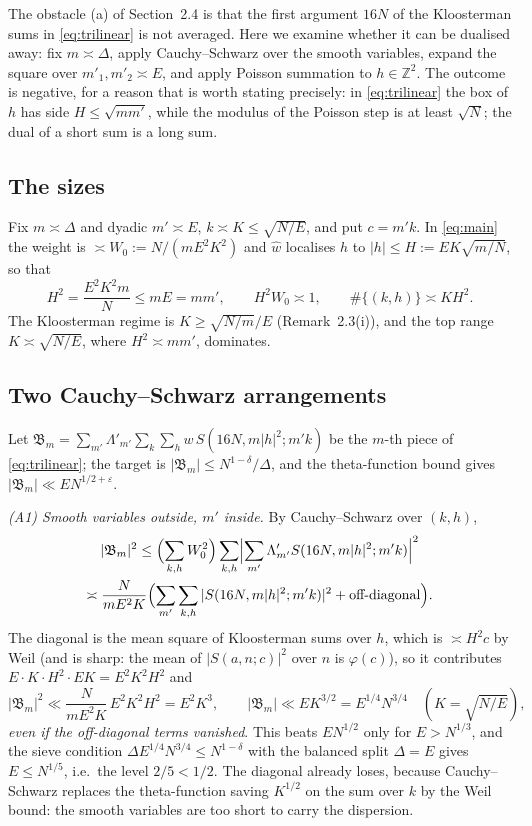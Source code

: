 \documentclass[11pt,a4paper]{article}
\theoremstyle{remark}
\theoremstyle{definition}
\newcommand{\Z}{\mathbb Z}
\newcommand{\e}{\varepsilon}
\begin{document}
The obstacle (a) of Section~2.4 is that the first argument $16N$ of the Kloosterman sums in \eqref{eq:trilinear} is not averaged. Here we examine whether it can be dualised away: fix $m\asymp\Delta$, apply Cauchy--Schwarz over the smooth variables, expand the square over $m'_1,m'_2\asymp E$, and apply Poisson summation to $h\in\Z^2$. The outcome is negative, for a reason that is worth stating precisely: in \eqref{eq:trilinear} the box of $h$ has side $H\le\sqrt{mm'}$, while the modulus of the Poisson step is at least $\sqrt N$; the dual of a short sum is a long sum.

\subsection{The sizes}
Fix $m\asymp\Delta$ and dyadic $m'\asymp E$, $k\asymp K\le\sqrt{N/E}$, and put $c=m'k$. In \eqref{eq:main} the weight is $\asymp W_0:=N/(mE^2K^2)$ and $\hat w$ localises $h$ to $|h|\le H:=EK\sqrt{m/N}$, so that
\begin{equation}\label{eq:sizes}
H^2=\frac{E^2K^2m}{N}\le mE=mm',\qquad H^2W_0\asymp1,\qquad \#\{(k,h)\}\asymp KH^2 .
\end{equation}
The Kloosterman regime is $K\ge\sqrt{N/m}/E$ (Remark~2.3(i)), and the top range $K\asymp\sqrt{N/E}$, where $H^2\asymp mm'$, dominates.

\subsection{Two Cauchy--Schwarz arrangements}
Let $\mathfrak B_m=\sum_{m'}\Lambda'_{m'}\sum_k\sum_hw\,S(16N,m|h|^2;m'k)$ be the $m$-th piece of \eqref{eq:trilinear}; the target is $|\mathfrak B_m|\le N^{1-\delta}/\Delta$, and the theta-function bound gives $|\mathfrak B_m|\ll EN^{1/2+\e}$.

\emph{(A1) Smooth variables outside, $m'$ inside.} By Cauchy--Schwarz over $(k,h)$,
\begin{multline*}
|\mathfrak B_m|^2\le\Bigl(\sum_{k,h}W_0^2\Bigr)\sum_{k,h}\Bigl|\sum_{m'}\Lambda'_{m'}S(16N,m|h|^2;m'k)\Bigr|^2\\
\asymp\frac{N}{mE^2K}\Bigl(\sum_{m'}\sum_{k,h}|S(16N,m|h|^2;m'k)|^2+\text{off-diagonal}\Bigr).
\end{multline*}
The diagonal is the mean square of Kloosterman sums over $h$, which is $\asymp H^2c$ by Weil (and is sharp: the mean of $|S(a,n;c)|^2$ over $n$ is $\varphi(c)$), so it contributes $E\cdot K\cdot H^2\cdot EK=E^2K^2H^2$ and
\[
|\mathfrak B_m|^2\ll\frac{N}{mE^2K}\,E^2K^2H^2=E^2K^3,\qquad |\mathfrak B_m|\ll EK^{3/2}=E^{1/4}N^{3/4}\quad(K=\sqrt{N/E}),
\]
\emph{even if the off-diagonal terms vanished}. This beats $EN^{1/2}$ only for $E>N^{1/3}$, and the sieve condition $\Delta E^{1/4}N^{3/4}\le N^{1-\delta}$ with the balanced split $\Delta=E$ gives $E\le N^{1/5}$, i.e.\ the level $2/5<1/2$. The diagonal already loses, because Cauchy--Schwarz replaces the theta-function saving $K^{1/2}$ on the sum over $k$ by the Weil bound: the smooth variables are too short to carry the dispersion.
\end{document}
